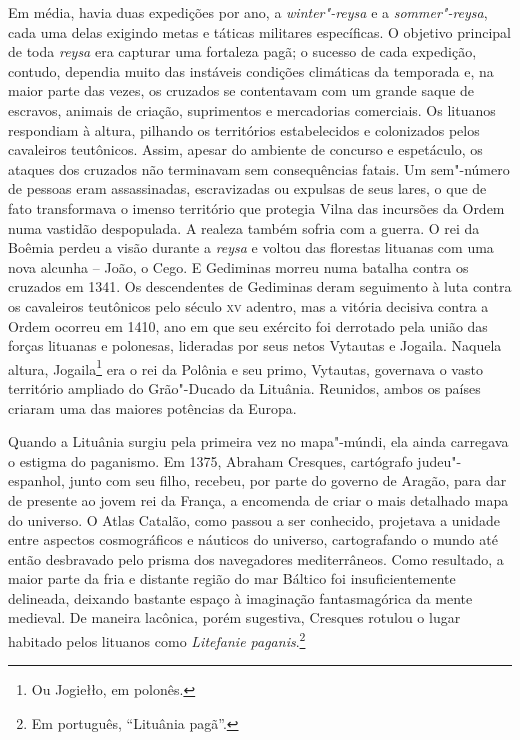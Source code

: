 Em média, havia duas expedições por ano, a \textit{winter"-reysa} e a
\textit{sommer"-reysa}, cada uma delas exigindo metas e táticas militares
específicas. O objetivo principal de toda \textit{reysa} era capturar uma
fortaleza pagã; o sucesso de cada expedição, contudo, dependia muito das
instáveis condições climáticas da temporada e, na maior parte das vezes,
os cruzados se contentavam com um grande saque de escravos, animais de
criação, suprimentos e mercadorias comerciais. Os lituanos respondiam à
altura, pilhando os territórios estabelecidos e colonizados pelos
cavaleiros teutônicos. Assim, apesar do ambiente de concurso e
espetáculo, os ataques dos cruzados não terminavam sem consequências
fatais. Um sem"-número de pessoas eram assassinadas, escravizadas ou
expulsas de seus lares, o que de fato transformava o imenso território
que protegia Vilna das incursões da Ordem numa vastidão despopulada. A
realeza também sofria com a guerra. O rei da Boêmia perdeu a visão
durante a \textit{reysa} e voltou das florestas lituanas com uma nova
alcunha -- João, o Cego. E Gediminas morreu numa batalha contra os
cruzados em 1341. Os descendentes de Gediminas deram seguimento à luta
contra os cavaleiros teutônicos pelo século \textsc{xv} adentro, mas a vitória
decisiva contra a Ordem ocorreu em 1410, ano em que seu exército foi
derrotado pela união das forças lituanas e polonesas, lideradas por seus
netos Vytautas e Jogaila. Naquela altura, Jogaila\footnote{Ou Jogiełło, em polonês.} 
era o rei da Polônia e seu primo, Vytautas, governava o vasto território
ampliado do Grão"-Ducado da Lituânia. Reunidos, ambos os países criaram
uma das maiores potências da Europa.

\asterisc

Quando a Lituânia surgiu pela primeira vez no mapa"-múndi, ela ainda
carregava o estigma do paganismo. Em 1375, Abraham Cresques, cartógrafo
judeu"-espanhol, junto com seu filho, recebeu, por parte do governo de
Aragão, para dar de presente ao jovem rei da França, a encomenda de
criar o mais detalhado mapa do universo. O Atlas Catalão, como passou a
ser conhecido, projetava a unidade entre aspectos cosmográficos e
náuticos do universo, cartografando o mundo até então desbravado pelo
prisma dos navegadores mediterrâneos. Como resultado, a maior parte da
fria e distante região do mar Báltico foi insuficientemente delineada,
deixando bastante espaço à imaginação fantasmagórica da mente medieval.
De maneira lacônica, porém sugestiva, Cresques rotulou o lugar habitado
pelos lituanos como \textit{Litefanie paganis}.\footnote{Em português, ``Lituânia pagã''.}

